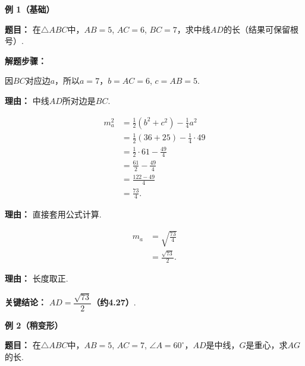 \begin{examplebox}
	\textbf{\textcolor{CExample}{例 1（基础）}}

	\textbf{\textcolor{CExample}{题目：}}
	在$\triangle ABC$中，$AB=5$, $AC=6$, $BC=7$，求中线$AD$的长（结果可保留根号）.

	\textbf{\textcolor{CExample}{解题步骤：}}
	\begin{description}[style=nextline, leftmargin=2.8em, labelsep=0.5em, itemsep=0.45em]
		\item[\textbf{第一步（确定对应边）：}] 因$BC$对应边$a$，所以$a=7$，$b=AC=6$, $c=AB=5$.
			\par\textbf{理由：} 中线$AD$所对边是$BC$.
		\item[\textbf{第二步（代入中线长公式）：}]
			\[
				\begin{aligned}
					m_a^2 &= \frac12(b^2+c^2) - \frac14 a^2 \\
					&= \frac12(36+25) - \frac14\cdot 49 \\
					&= \frac12\cdot 61 - \frac{49}{4} \\
					&= \frac{61}{2} - \frac{49}{4} \\
					&= \frac{122-49}{4} \\
					&= \frac{73}{4}.
			\end{aligned}
			\]
			\par\textbf{理由：} 直接套用公式计算.
		\item[\textbf{第三步（开平方得中线）：}]
			\[
				\begin{aligned}
					m_a &= \sqrt{\frac{73}{4}} \\
					&= \frac{\sqrt{73}}{2}.
			\end{aligned}
			\]
			\par\textbf{理由：} 长度取正.
	\end{description}

	\textbf{\textcolor{CExample}{关键结论：}}
	\textbf{$AD = \dfrac{\sqrt{73}}{2}$（约4.27）}.

	\medskip
	\textbf{\textcolor{CExample}{例 2（稍变形）}}

	\textbf{\textcolor{CExample}{题目：}}
	在$\triangle ABC$中，$AB=5$, $AC=7$, $\angle A=60^\circ$，$AD$是中线，$G$是重心，求$AG$的长.


\end{examplebox}
